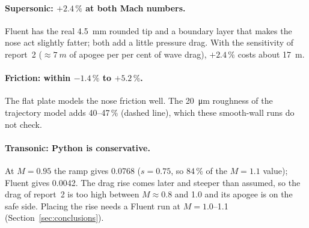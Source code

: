 \paragraph{Supersonic: $+2.4\,\%$ at both Mach numbers.} Fluent has the real \SI{4.5}{mm} rounded tip and a
boundary layer that makes the nose act slightly fatter; both add a little pressure drag. With the
sensitivity of report~2 ($\approx\SI{7}{m}$ of apogee per per cent of wave drag), $+2.4\,\%$ costs about
\SI{17}{m}.

\paragraph{Friction: within $-1.4\,\%$ to $+5.2\,\%$.} The flat plate models the nose friction well. The
\SI{20}{\micro m} roughness of the trajectory model adds 40--47\,\% (dashed line), which these smooth-wall
runs do not check.

\paragraph{Transonic: Python is conservative.} At $M = 0.95$ the ramp gives 0.0768 ($s = 0.75$, so
84\,\% of the $M = 1.1$ value); Fluent gives 0.0042. The drag rise comes later and steeper than assumed,
so the drag of report~2 is too high between $M \approx 0.8$ and 1.0 and its apogee is on the safe side.
Placing the rise needs a Fluent run at $M = 1.0$--1.1 (Section~\ref{sec:conclusions}).
